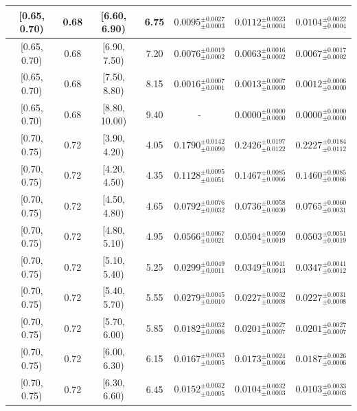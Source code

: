 \begin{longtable}{|c|c|c|c|c|c|c|}
\hline
[0.65, 0.70) & 0.68 & [6.60, 6.90) & 6.75 & $0.0095^{ \pm 0.0027 }_{ \pm 0.0003 }$ & $0.0112^{ \pm 0.0023 }_{ \pm 0.0004 }$ & $0.0104^{ \pm 0.0022 }_{ \pm 0.0004 }$ \\ 
\hline
[0.65, 0.70) & 0.68 & [6.90, 7.50) & 7.20 & $0.0076^{ \pm 0.0019 }_{ \pm 0.0002 }$ & $0.0063^{ \pm 0.0016 }_{ \pm 0.0002 }$ & $0.0067^{ \pm 0.0017 }_{ \pm 0.0002 }$ \\ 
\hline
[0.65, 0.70) & 0.68 & [7.50, 8.80) & 8.15 & $0.0016^{ \pm 0.0007 }_{ \pm 0.0001 }$ & $0.0013^{ \pm 0.0007 }_{ \pm 0.0000 }$ & $0.0012^{ \pm 0.0006 }_{ \pm 0.0000 }$ \\ 
\hline
[0.65, 0.70) & 0.68 & [8.80, 10.00) & 9.40 & - & $0.0000^{ \pm 0.0000 }_{ \pm 0.0000 }$ & $0.0000^{ \pm 0.0000 }_{ \pm 0.0000 }$ \\ 
\hline
[0.70, 0.75) & 0.72 & [3.90, 4.20) & 4.05 & $0.1790^{ \pm 0.0142 }_{ \pm 0.0090 }$ & $0.2426^{ \pm 0.0197 }_{ \pm 0.0122 }$ & $0.2227^{ \pm 0.0184 }_{ \pm 0.0112 }$ \\ 
\hline
[0.70, 0.75) & 0.72 & [4.20, 4.50) & 4.35 & $0.1128^{ \pm 0.0095 }_{ \pm 0.0051 }$ & $0.1467^{ \pm 0.0085 }_{ \pm 0.0066 }$ & $0.1460^{ \pm 0.0085 }_{ \pm 0.0066 }$ \\ 
\hline
[0.70, 0.75) & 0.72 & [4.50, 4.80) & 4.65 & $0.0792^{ \pm 0.0076 }_{ \pm 0.0032 }$ & $0.0736^{ \pm 0.0058 }_{ \pm 0.0030 }$ & $0.0765^{ \pm 0.0060 }_{ \pm 0.0031 }$ \\ 
\hline
[0.70, 0.75) & 0.72 & [4.80, 5.10) & 4.95 & $0.0566^{ \pm 0.0067 }_{ \pm 0.0021 }$ & $0.0504^{ \pm 0.0050 }_{ \pm 0.0019 }$ & $0.0503^{ \pm 0.0051 }_{ \pm 0.0019 }$ \\ 
\hline
[0.70, 0.75) & 0.72 & [5.10, 5.40) & 5.25 & $0.0299^{ \pm 0.0049 }_{ \pm 0.0011 }$ & $0.0349^{ \pm 0.0041 }_{ \pm 0.0013 }$ & $0.0347^{ \pm 0.0041 }_{ \pm 0.0012 }$ \\ 
\hline
[0.70, 0.75) & 0.72 & [5.40, 5.70) & 5.55 & $0.0279^{ \pm 0.0045 }_{ \pm 0.0010 }$ & $0.0227^{ \pm 0.0032 }_{ \pm 0.0008 }$ & $0.0227^{ \pm 0.0031 }_{ \pm 0.0008 }$ \\ 
\hline
[0.70, 0.75) & 0.72 & [5.70, 6.00) & 5.85 & $0.0182^{ \pm 0.0032 }_{ \pm 0.0006 }$ & $0.0201^{ \pm 0.0027 }_{ \pm 0.0007 }$ & $0.0201^{ \pm 0.0027 }_{ \pm 0.0007 }$ \\ 
\hline
[0.70, 0.75) & 0.72 & [6.00, 6.30) & 6.15 & $0.0167^{ \pm 0.0033 }_{ \pm 0.0005 }$ & $0.0173^{ \pm 0.0024 }_{ \pm 0.0006 }$ & $0.0187^{ \pm 0.0026 }_{ \pm 0.0006 }$ \\ 
\hline
[0.70, 0.75) & 0.72 & [6.30, 6.60) & 6.45 & $0.0152^{ \pm 0.0032 }_{ \pm 0.0005 }$ & $0.0104^{ \pm 0.0032 }_{ \pm 0.0003 }$ & $0.0103^{ \pm 0.0033 }_{ \pm 0.0003 }$ \\ 

\end{longtable}
